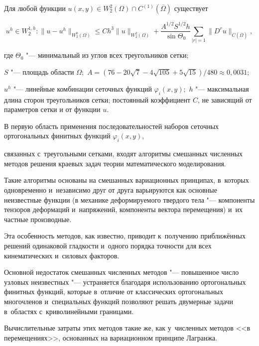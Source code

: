 \begin{theorem} Для любой функции $ u (x, y) \in W_{2}^{2} (\Omega) \cap C^{(1)}(\overline \Omega)$ существует 

$$u^{h} \in W_{2}^{1, h} :   \| u - u^{h}\|_{W_2^0 (\Omega)} 

\leq Ch^3\| u\|_{W_2^2 (\Omega)} + 

\frac{A^{1/2}S^{1/2}h} {\sin\Theta _0 } \sum\limits_{|r| = 1} \| D^ru \|_{C( \overline \Omega)} ,$$ 

где $\Theta _{0} $ "--- минимальный из углов всех треугольников сетки{\rm;} 

$S$ "--- площадь области $\Omega ;$ $A = (76 - 20\sqrt {7} -4\sqrt {105} + 5\sqrt {15} )/480 \approx 0{,}0031;$ 

$u^{h}$ "--- линейные комбинации  сеточных функций $\varphi _{i} (x, y);$  $h$ "--- максимальная длина сторон треугольников сетки\/{\rm;} постоянный коэффициент  $C$, не зависящий от параметров сетки и от функции $u$.

 

\end{theorem} 

\smallskip

 

В первую область применения последовательностей наборов сеточных  ортогональных финитных функций $\varphi _{i} (x, y)$, 

связанных с~треугольными сетками, входят алгоритмы смешанных численных методов решения краевых задач теории математического моделирования. 

Такие  алгоритмы основаны на смешанных вариационных принципах, в~которых  одновременно и~независимо друг от друга варьируются как основные неизвестные функции (в механике деформируемого твердого тела "--- компоненты тензоров деформаций и~напряжений, компоненты вектора перемещения) и~их частные производные.

Эта особенность методов, как известно, приводит к~получению приближённых решений одинаковой гладкости и~одного порядка точности для всех кинематических и~силовых факторов. 

Основной недостаток смешанных численных методов "--- повышенное число узловых неизвестных "--- устраняется благодаря использованию ортогональных финитных функций, которые в~отличие от классических ортогональных многочленов и~специальных функций позволяют решать двумерные задачи в~областях с~криволинейными границами. 

Вычислительные затраты этих методов такие же, как у~численных методов <<в перемещениях>>, основанных на вариационном принципе Лагранжа. 

